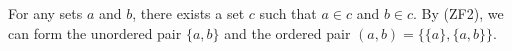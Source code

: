 For any sets $a$ and $b$, there exists a set $c$ such that $a \in c$ and $b \in c$. By (ZF2), we can form the unordered pair $\{a, b\}$ and the ordered pair $(a, b) = \{\{a\}, \{a, b\}\}$.
